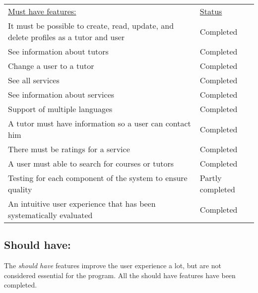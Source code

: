 \begin{table}[h]
    \begin{tabularx}{\textwidth}{|X|l|}
    \underline{Must have features:}                                                                   & \underline{Status} \\
    It must be possible to create, read, update, and delete profiles as a tutor and user              & Completed \\
    See information about tutors                                                                      & Completed \\
    Change a user to a tutor                                                                          & Completed \\
    See all services                                                                                  & Completed \\
    See information about services                                                                    & Completed \\
    Support of multiple languages                                                                     & Completed \\
    A tutor must have information so a user can contact him                                           & Completed \\
    There must be ratings for a service                                                                 & Completed \\
    A user must able to search for courses or tutors                                                  & Completed \\
    Testing for each component of the system to ensure quality                                        & Partly completed \\
    An intuitive user experience that has been systematically evaluated                               & Completed \\
    \end{tabularx}
\end{table}

\subsection{Should have:}
The \textit{should have} features improve the user experience a lot, but are not considered essential for the program.
All the should have features have been completed.

